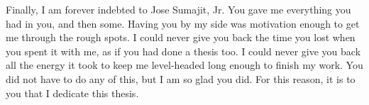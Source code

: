 {Finally, I am forever indebted to Jose Sumajit, Jr.  You gave me everything you
had in you, and then some.  Having you by my side was motivation enough to get
me through the rough spots.  I could never give you back the time you lost when
you spent it with me, as if you had done a thesis too.  I could never give you
back all the energy it took to keep me level-headed long enough to finish my
work.  You did not have to do any of this, but I am so glad you did.  For this
reason, it is to you that I dedicate this thesis.

}



